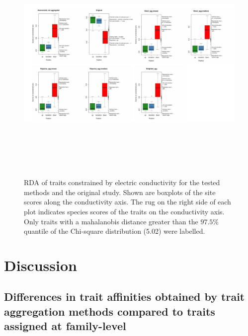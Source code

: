 \documentclass{article}
\begin{document}
\begin{figure}
  \label{fig:boxplots_scores_on_constrained_axis}
  \centering
  \includegraphics[width= 22cm, height=12cm]{Scores_on_constrained_axis_combined.pdf}
  \caption{RDA of traits constrained by electric conductivity for the tested methods and the original study. Shown are boxplots of the site scores along the conductivity axis. The rug on the right side of each plot indicates species scores of the traits on the conductivity axis. Only traits with a mahalanobis distance greater than the $97.5 \%$ quantile of the Chi-square distribution (5.02) were labelled.}
\end{figure}

\newpage


\section*{Discussion}

\subsection*{Differences in trait affinities obtained by trait aggregation methods compared to traits assigned at family-level}
\end{document}

